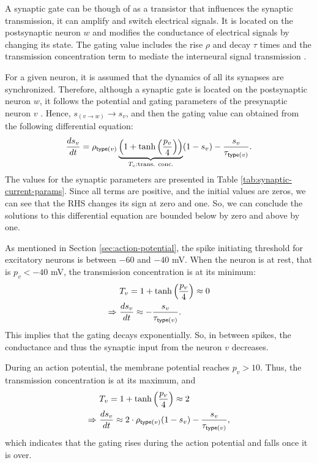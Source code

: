 A synaptic gate can be though of as a transistor that influences the synaptic transmission, it can amplify and switch electrical signals. It is located on the postsynaptic neuron $w$ and modifies the conductance of electrical signals by changing its state. The gating value includes the rise $\rho$ and decay $\tau$ times and the transmission concentration term to mediate the interneural signal transmission \cite{Destexhe1994}.

For a given neuron, it is assumed that the dynamics of all its synapses are synchronized. Therefore, although a synaptic gate is located on the postsynaptic neuron $w$, it follows the potential and gating parameters of the presynaptic neuron $v$ \cite{Lowet2015}. Hence, $s_{(v \to w)} \to s_v$, and then the gating value can obtained from the following differential equation:
\begin{equation}
    \frac{ds_v}{dt} = \rho_{\mathsf{type}(v)} \underbrace{\left( 1 + \tanh \left( \frac{p_{v}}{4} \right) \right)}_{T_v: \text{trans. conc.}} (1 - s_v) - \frac{s_v}{\tau_{\mathsf{type}(v)}}.
    \label{eq:synaptic-gates}
\end{equation}
The values for the synaptic parameters are presented in Table \ref{tab:synaptic-current-params}.
Since all terms are positive, and the initial values are zeros, we can see that the RHS changes its sign at zero and one. So, we can conclude the solutions to this differential equation are bounded below by zero and above by one.

As mentioned in Section \ref{sec:action-potential}, the spike initiating threshold for excitatory neurons is between $-60$ and $-40$ mV. When the neuron is at rest, that is $p_v < -40$ mV, the transmission concentration is at its minimum:
\begin{gather}
\begin{split}
    & T_v = 1 + \tanh \left( \frac{p_{v}}{4} \right) \approx 0 \\
    \Rightarrow \ & \frac{ds_v}{dt} \approx - \frac{s_v}{\tau_{\mathsf{type}(v)}}.
\end{split}
\end{gather}
This implies that the gating decays exponentially.
So, in between spikes, the conductance and thus the synaptic input from the neuron $v$ decreases. 

During an action potential, the membrane potential reaches $p_v > 10$. Thus, the transmission concentration is at its maximum, and
\begin{gather}
\begin{split}
    & T_v = 1 + \tanh \left( \frac{p_{v}}{4} \right) \approx 2 \\
    \Rightarrow \ & \frac{ds_v}{dt} \approx 2 \cdot \rho_{\mathsf{type}(v)} (1 - s_v) - \frac{s_v}{\tau_{\mathsf{type}(v)}},
\end{split}
\end{gather}
which indicates that the gating rises during the action potential and falls once it is over. 

